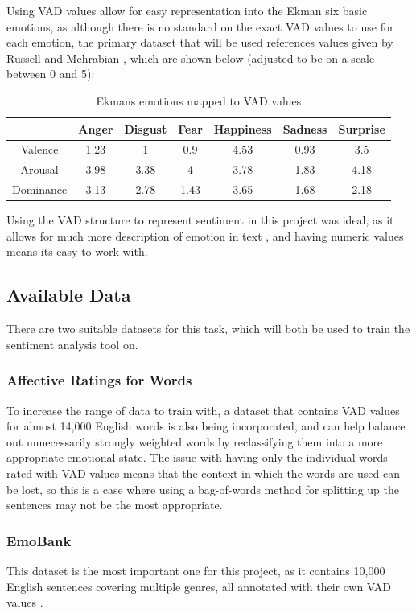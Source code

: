 Using VAD values allow for easy representation into the Ekman six basic emotions, as although there is no standard on the exact VAD values to use for each emotion, the primary dataset that will be used references values given by Russell and Mehrabian \cite{VADMapping}, which are shown below (adjusted to be on a scale between 0 and 5):


\begin{table}[ht]
\caption{Ekmans emotions mapped to VAD values \cite{VADMapping}}
\centering
\begin{tabular}{ |c|c|c|c|c|c|c| } 
 \hline
  & Anger & Disgust & Fear & Happiness & Sadness & Surprise \\ 
 \hline                        
 Valence & 1.23 & 1 & 0.9 & 4.53 & 0.93 & 3.5\\ 
 Arousal & 3.98 & 3.38 & 4 & 3.78 & 1.83 & 4.18\\ 
 Dominance & 3.13 & 2.78 & 1.43 & 3.65 & 1.68 & 2.18\\ 
 \hline
\end{tabular}
\label{ekmansTable}
\end{table}

Using the VAD structure to represent sentiment in this project was ideal, as it allows for much more description of emotion in text \cite{emotionPerspective}, and having numeric values means its easy to work with.


\subsection{Available Data}
There are two suitable datasets for this task, which will both be used to train the sentiment analysis tool on.

\subsubsection{Affective Ratings for Words}
To increase the range of data to train with, a dataset that contains VAD values for almost 14,000 English words\cite{wordsData} is also being incorporated, and can help balance out unnecessarily strongly weighted words by reclassifying them into a more appropriate emotional state. The issue with having only the individual words rated with VAD values means that the context in which the words are used can be lost, so this is a case where using a bag-of-words method for splitting up the sentences may not be the most appropriate.

\subsubsection{EmoBank}
This dataset is the most important one for this project, as it contains 10,000 English sentences covering multiple genres, all annotated with their own VAD values \cite{emoBank}.

